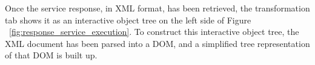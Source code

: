 
Once the service response, in XML format, has been retrieved, the transformation tab shows it as an interactive object tree on the left side of Figure ~\ref{fig:response_service_execution}. To construct this interactive object tree, the XML document has been parsed into a DOM, and a simplified tree representation of that DOM is built up. 

